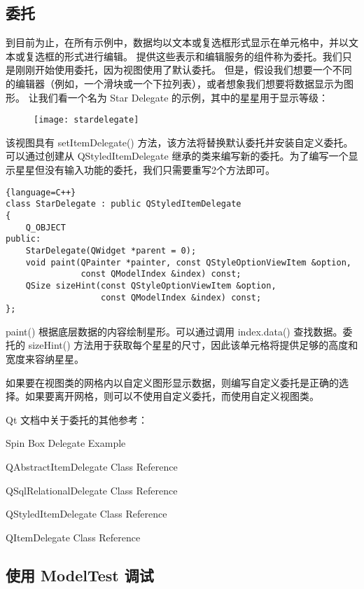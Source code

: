 \subsection{委托}

到目前为止，在所有示例中，数据均以文本或复选框形式显示在单元格中，并以文本或复选框的形式进行编辑。
提供这些表示和编辑服务的组件称为委托。我们只是刚刚开始使用委托，因为视图使用了默认委托。
但是，假设我们想要一个不同的编辑器（例如，一个滑块或一个下拉列表），或者想象我们想要将数据显示为图形。
让我们看一个名为 Star Delegate 的示例，其中的星星用于显示等级：


\begin{figure}[hbt!]  
\texttt{[image: stardelegate]}
\end{figure}

该视图具有 setItemDelegate() 方法，该方法将替换默认委托并安装自定义委托。
可以通过创建从 QStyledItemDelegate 继承的类来编写新的委托。为了编写一个显示星星但没有输入功能的委托，我们只需要重写2个方法即可。


\begin{lstlisting}{language=C++}
class StarDelegate : public QStyledItemDelegate
{
    Q_OBJECT
public:
    StarDelegate(QWidget *parent = 0);
    void paint(QPainter *painter, const QStyleOptionViewItem &option,
               const QModelIndex &index) const;
    QSize sizeHint(const QStyleOptionViewItem &option,
                   const QModelIndex &index) const;
};
\end{lstlisting}

paint() 根据底层数据的内容绘制星形。可以通过调用 index.data() 查找数据。委托的 sizeHint() 方法用于获取每个星星的尺寸，因此该单元格将提供足够的高度和宽度来容纳星星。

如果要在视图类的网格内以自定义图形显示数据，则编写自定义委托是正确的选择。如果要离开网格，则可以不使用自定义委托，而使用自定义视图类。

Qt 文档中关于委托的其他参考：

\begin{compactitem}
\item Spin Box Delegate Example
\item QAbstractItemDelegate Class Reference
\item QSqlRelationalDelegate Class Reference
\item QStyledItemDelegate Class Reference
\item QItemDelegate Class Reference
\end{compactitem}

\subsection{使用 ModelTest 调试}

